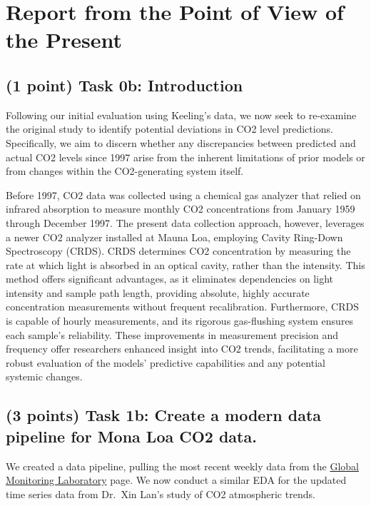 \documentclass[
]{article}
\begin{document}
\newpage

\section{Report from the Point of View of the Present}\label{report-from-the-point-of-view-of-the-present}

\subsection{(1 point) Task 0b: Introduction}\label{point-task-0b-introduction}

Following our initial evaluation using Keeling's data, we now seek to re-examine the original study to identify potential deviations in CO2 level predictions. Specifically, we aim to discern whether any discrepancies between predicted and actual CO2 levels since 1997 arise from the inherent limitations of prior models or from changes within the CO2-generating system itself.

Before 1997, CO2 data was collected using a chemical gas analyzer that relied on infrared absorption to measure monthly CO2 concentrations from January 1959 through December 1997. The present data collection approach, however, leverages a newer CO2 analyzer installed at Mauna Loa, employing Cavity Ring-Down Spectroscopy (CRDS). CRDS determines CO2 concentration by measuring the rate at which light is absorbed in an optical cavity, rather than the intensity. This method offers significant advantages, as it eliminates dependencies on light intensity and sample path length, providing absolute, highly accurate concentration measurements without frequent recalibration. Furthermore, CRDS is capable of hourly measurements, and its rigorous gas-flushing system ensures each sample's reliability. These improvements in measurement precision and frequency offer researchers enhanced insight into CO2 trends, facilitating a more robust evaluation of the models' predictive capabilities and any potential systemic changes.

\subsection{(3 points) Task 1b: Create a modern data pipeline for Mona Loa CO2 data.}\label{points-task-1b-create-a-modern-data-pipeline-for-mona-loa-co2-data.}

We created a data pipeline, pulling the most recent weekly data from the \href{https://gml.noaa.gov/ccgg/trends/data.html}{Global Monitoring Laboratory} page. We now conduct a similar EDA for the updated time series data from Dr.~Xin Lan's study of CO2 atmospheric trends.
\end{document}
